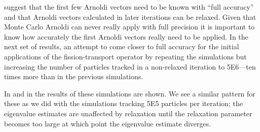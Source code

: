 \begin{comment}
          0.0005 &   140 & 2.554e+09 & 0.9772 $\pm$  1.2\e{-4} &   8134.5 & 7909.4 \\
         0.00075 &   150 & 2.562e+09 & 0.9773 $\pm$  8.5\e{-5} &  17608.8 & 7945.2 \\
           0.001 &   160 & 2.585e+09 & 0.9771 $\pm$  8.0\e{-5} &  19293.4 & 8010.1 \\
          0.0025 &   187 & 2.551e+09 & 0.9773 $\pm$  1.0\e{-4} &  12740.4 & 7899.2 \\
           0.005 &   220 & 2.498e+09 & 0.9774 $\pm$  1.7\e{-4} &   4415.6 & 7754.7 \\
          0.0075 &   270 & 2.559e+09 & 0.9779 $\pm$  1.9\e{-4} &   3350.6 & 7938.2 \\
            0.01 &   316 & 2.537e+09 & 0.9780 $\pm$  2.0\e{-4} &   3050.0 & 7879.3 \\
            0.05 &  1250 & 2.476e+09 & 0.9787 $\pm$  1.1\e{-4} &  11365.8 & 7724.8 \\
             0.1 &  1800 & 2.520e+09 & 0.9797 $\pm$  1.3\e{-4} &   7252.4 & 7872.8 \\
             0.5 &  2300 & 2.506e+09 & 0.9881 $\pm$  1.5\e{-4} &   5872.1 & 7854.4 \\
               1 &  2350 & 2.502e+09 & 0.9957 $\pm$  1.4\e{-4} &   6202.1 & 7824.0 \\
        \bottomrule
    \end{tabular}
    \caption{Second higher order eigenvalue estimates with relaxation.}
    \label{tab:Relaxed2}
\end{table}
\end{comment}

\citet{Bouras:2000A-rel-1} suggest that the first few Arnoldi vectors need to be known with ``full accuracy'' and that Arnoldi vectors calculated in later iterations can be relaxed.  Given that Monte Carlo Arnoldi can never really apply \A{} with full precision it is important to know how accurately the first Arnoldi vectors really need to be applied.  In the next set of results, an attempt to come closer to full accuracy for the initial applications of the fission-transport operator by repeating the simulations but increasing the number of particles tracked in a non-relaxed iteration to 5E6---ten times more than in the previous simulations.

In  and in  the results of these simulations are shown.  We see a similar pattern for these as we did with the simulations tracking 5E5 particles per iteration; the eigenvalue estimates are unaffected by relaxation until the relaxation parameter becomes too large at which point the eigenvalue estimate diverges.  

